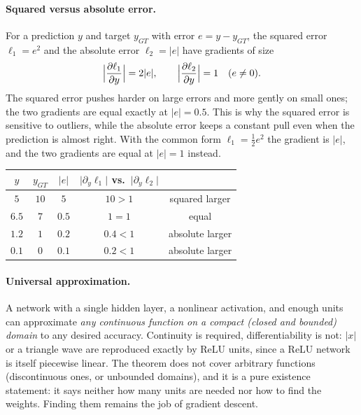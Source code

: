 \paragraph{Squared versus absolute error.}
For a prediction $y$ and target $y_{GT}$ with error $e = y - y_{GT}$, the squared
error $\ell_1 = e^2$ and the absolute error $\ell_2 = \lvert e\rvert$ have gradients
of size
\begin{equation}
  \Bigl\lvert\frac{\partial\ell_1}{\partial y}\Bigr\rvert = 2\lvert e\rvert,
  \qquad
  \Bigl\lvert\frac{\partial\ell_2}{\partial y}\Bigr\rvert = 1
  \quad (e\ne 0).
\end{equation}
\noindent
The squared error pushes harder on large errors and more gently on small ones;
the two gradients are equal exactly at $\lvert e\rvert = 0.5$. This is why the
squared error is sensitive to outliers, while the absolute error keeps a constant
pull even when the prediction is almost right. With the common form
$\ell_1 = \tfrac12 e^2$ the gradient is $\lvert e\rvert$, and the two gradients
are equal at $\lvert e\rvert = 1$ instead.
\begin{center}
  \begin{tabular}{@{}ccccc@{}}
    \toprule
    $y$ & $y_{GT}$ & $\lvert e\rvert$ & $\lvert\partial_y\ell_1\rvert$ vs.\ $\lvert\partial_y\ell_2\rvert$ & \\
    \midrule
    $5$ & $10$ & $5$ & $10 > 1$ & squared larger \\
    $6.5$ & $7$ & $0.5$ & $1 = 1$ & equal \\
    $1.2$ & $1$ & $0.2$ & $0.4 < 1$ & absolute larger \\
    $0.1$ & $0$ & $0.1$ & $0.2 < 1$ & absolute larger \\
    \bottomrule
  \end{tabular}
\end{center}

\paragraph{Universal approximation.}
A network with a single hidden layer, a nonlinear activation, and enough units
can approximate \emph{any continuous function on a compact (closed and bounded)
domain} to any desired accuracy. Continuity is required, differentiability is
not: $\lvert x\rvert$ or a triangle wave are reproduced exactly by ReLU units,
since a ReLU network is itself piecewise linear. The theorem does not cover
arbitrary functions (discontinuous ones, or unbounded domains), and it is a pure
existence statement: it says neither how many units are needed nor how to find
the weights. Finding them remains the job of gradient descent.

